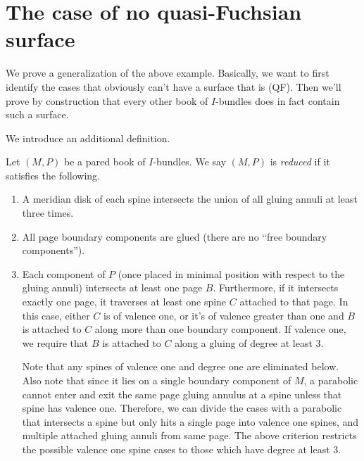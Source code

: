 \section{The case of no quasi-Fuchsian surface}

We prove a generalization of the above example. Basically, we want to first
identify the cases that obviously can't have a surface that is (QF). Then we'll
prove by construction that every other book of $I$-bundles does in fact contain
such a surface.

We introduce an additional definition.

\begin{defn}

Let $(M,P)$ be a pared book of $I$-bundles. We say $(M,P)$ is \emph{reduced} if
it satisfies the following.

\begin{enumerate}

\item A meridian disk of each spine intersects the union of all gluing annuli
at least three times.

\item All page boundary components are glued (there are no ``free boundary
components'').

\item Each component of $P$ (once placed in minimal position with respect to
the gluing annuli) intersects at least one page $B$. Furthermore, if it
intersects exactly one page, it traverses at least one spine $C$ attached to
that page. In this case, either $C$ is of valence one, or it's of valence
greater than one and $B$ is attached to $C$ along more than one boundary
component.  If valence one, we require that $B$ is attached to $C$ along
a gluing of degree at least 3.

Note that any spines of valence one and degree one are eliminated below.  Also
note that since it lies on a single boundary component of $M$, a parabolic
cannot enter and exit the same page gluing annulus at a spine unless that spine
has valence one. Therefore, we can divide the cases with a parabolic that
intersects a spine but only hits a single page into valence one spines, and
multiple attached gluing annuli from same page. The above criterion restricts
the possible valence one spine cases to those which have degree at least 3.

\end{enumerate}

\end{defn}


